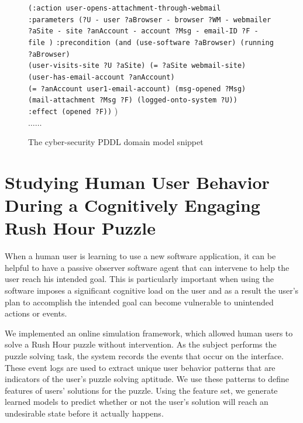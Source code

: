 \documentclass[doctor]{thesis} %
\theoremstyle{plain}
\begin{document}
\begin{figure}[pbt]
{{{\hspace*{35pt}\texttt{(:action user-opens-attachment-through-webmail}\\
\hspace*{35pt}\texttt{:parameters (?U - user ?aBrowser - browser ?WM - webmailer \\\hspace*{35pt}?aSite - site  ?anAccount - account ?Msg - email-ID  ?F - file )}
\hspace*{35pt}\texttt{:precondition (and  (use-software ?aBrowser) (running ?aBrowser) \\\hspace*{35pt}(user-visits-site ?U ?aSite) (= ?aSite webmail-site)\\\hspace*{35pt}(user-has-email-account ?anAccount)\\\hspace*{35pt}(= ?anAccount user1-email-account) (msg-opened ?Msg)\\\hspace*{35pt}(mail-attachment ?Msg ?F) (logged-onto-system ?U))}\\
\hspace*{35pt}\texttt{:effect (opened ?F))} 
 )\\\hspace*{35pt}$\ldots\ldots$
}
}
}
\caption{The cyber-security PDDL domain model snippet}
\label{fig:cybersecdomain}
\end{figure}



\section*{Studying Human User Behavior During a Cognitively Engaging Rush Hour Puzzle}
When a human user is learning to use a new software application, it can be helpful to have a passive observer software agent that can intervene to help the user reach his intended goal. This is particularly important when using the software imposes a significant cognitive load on the user and as a result the user's plan to accomplish the intended goal can become vulnerable to unintended actions or events. 

We implemented an online simulation framework, which allowed human users to solve a Rush Hour puzzle without intervention. As the subject performs the puzzle solving task, the system records the events that occur on the interface. These event logs are used to extract unique user behavior patterns that are indicators of the user's puzzle solving aptitude. We use these patterns to define features of users' solutions for the puzzle. Using the feature set, we generate learned models to predict whether or not the user's solution will reach an undesirable state before it actually happens. 
\end{document}
